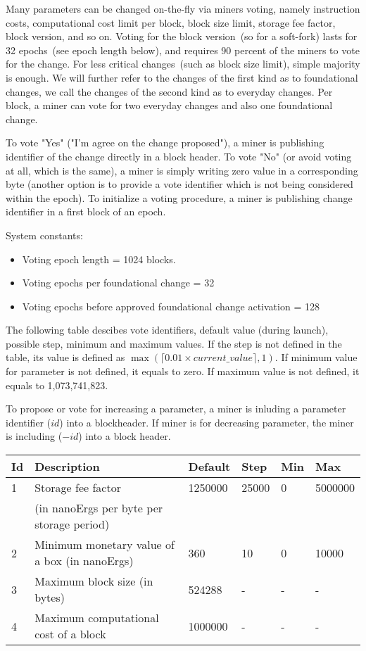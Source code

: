 Many parameters can be changed on-the-fly via miners voting, namely instruction costs, computational cost limit per block,
block size limit, storage fee factor, block version, and so on. Voting for the block version~(so for a soft-fork)
lasts for 32 epochs~(see epoch length below), and requires 90 percent of the miners to vote for the change.
For less critical changes~(such as block size limit), simple majority is enough. We will further refer to the changes
of the first kind as to foundational changes, we call the changes of the second kind as to everyday changes.
Per block, a miner can vote for two everyday changes and also one foundational change.

To vote "Yes" ("I'm agree on the change proposed"), a miner is publishing identifier of the change directly in a
block header. To vote "No" (or avoid voting at all, which is the same), a miner is simply writing zero value in
a corresponding byte (another option is to provide a vote identifier which is not being considered within the epoch).
To initialize a voting procedure, a miner is publishing change identifier in a first block of an epoch.


System constants:
\begin{itemize}
\item{} Voting epoch length = 1024 blocks.
\item{} Voting epochs per foundational change = 32
\item{} Voting epochs before approved foundational change activation = 128
\end{itemize}

The following table descibes vote identifiers, default value (during launch), possible step, minimum and maximum values.
If the step is not defined in the table, its value is defined as $\max(\lceil0.01 \times current\_value\rceil, 1)$.
If minimum value for parameter is not defined, it equals to zero. If maximum value is not defined, it equals to
1,073,741,823.

To propose or vote for increasing a parameter, a miner is inluding a parameter identifier ($id$) into a blockheader.
If miner is for decreasing parameter, the miner is including ($-id$) into a block header.

\begin{tabular}{| l | l | l | l | l | l |}
\hline
Id & Description & Default & Step & Min & Max \\
\hline
\hline
1 & Storage fee factor  & 1250000 & 25000 & 0 & 5000000 \\
  &  (in nanoErgs per byte per storage period) & & & & \\
\hline
2 & Minimum monetary value of a box (in nanoErgs) & 360 & 10 & 0 & 10000 \\
\hline
3 & Maximum block size (in bytes) & 524288 & - & - & - \\
\hline
4 & Maximum computational cost of a block & 1000000 & - & - & - \\
\hline
\end{tabular}